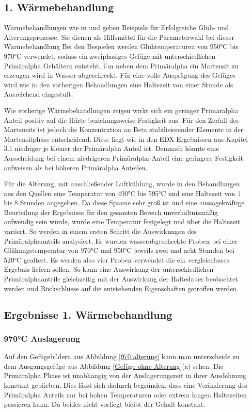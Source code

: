 \documentclass[a4paper, 11pt]{tubsreprt}
\begin{document}
\subsection{1. Wärmebehandlung}
Wärmebehandlungen wie in \cite{Gilbert2004} und \cite{chen2008} geben Beispiele für Erfolgreiche Glüh- und Alterungsprozesse. Sie dienen als Hilfsmittel für die Parameterwahl bei dieser Wärmebehandlung Bei den Bespielen werden Glühtemperaturen von 950°C bis 970°C verwendet, sodass ein zweiphasiges Gefüge mit unterschiedlichen Primäralpha Gehältern entsteht. Um neben dem Primäralpha ein Martensit zu erzeugen wird in Wasser abgeschreckt. Für eine volle Ausprägung des Gefüges wird wie in den vorherigen Behandlungen eine Haltezeit von einer Stunde als Ausreichend eingestuft.

Wie vorherige Wärmebehandlungen zeigen wirkt sich ein geringer Primäralpha Anteil positiv auf die Härte beziehungsweise Festigkeit aus. Für den Zerfall des Martensits ist jedoch die Konzentration an Beta stabilisierender Elemente in der Martensitphase entscheidend. Diese liegt wie in den EDX Ergebnissen aus Kapitel 3.1 niedriger je kleiner der Primäralpha Anteil ist. Demnach könnte eine Ausscheidung bei einem niedrigeren Primäralpha Anteil eine geringere Festigkeit aufweisen als bei höheren Primäralpha Anteilen.

Für die Alterung, mit anschließender Luftkühlung, wurde in den Behandlungen aus den Quellen eine Temperatur von 490°C bis 595°C und eine Haltezeit von 1 bis 8 Stunden angegeben. Da diese Spanne sehr groß ist und eine aussagekräftige Beurteilung der Ergebnisse für den gesamten Bereich unverhältnismäßig aufwendig sein würde, wurde eine Temperatur festgelegt und über die Haltezeit variiert. So werden in einem ersten Schritt die Auswirkungen des Primäralphaanteils analysiert. Es wurden wasserabgescheckte Proben bei einer Glühungstemperatur von 970°C und 950°C jeweils zwei und acht Stunden bei 520°C gealtert. Es werden also vier Proben verwendet die ein vergleichbares Ergebnis liefern sollen. So kann eine Auswirkung der unterschiedlichen Primäralphaanteile gleichzeitig mit der Auswirkung der Haltedauer beobachtet werden und Rückschlüsse auf die entstehenden Eigenschaften getroffen werden.
\subsection{Ergebnisse 1. Wärmebehandlung}
\subsubsection{970°C Auslagerung}
Auf den Gefügebildern aus Abbildung \ref{970 alterung} kann man unterscheide zu dem Ausgangsgefüge aus Abbildung \ref{Gefüge ohne Alterung}(a) sehen. Die Primäralpha Phase ist unabhängig von der Auslagerungszeit in ihrer Ausdehnung konstant geblieben. Dies lässt sich dadurch begründen, dass eine Veränderung des Primäralpha Anteils nur bei hohen Temperaturen oder extrem langen Haltezeiten passieren kann. Da beides nicht vorliegt bleibt der Gehalt konstant.
\end{document}
